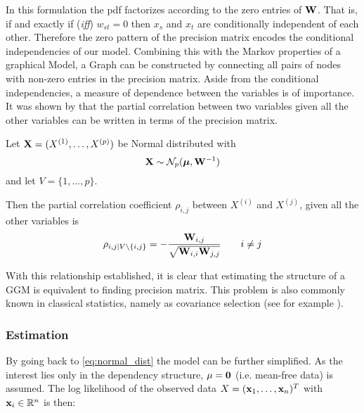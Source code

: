 In this formulation the \gls{pdf} factorizes according to the zero entries of $\mathbf{W}$.
That is, if and exactly if (\textit{iff}) $w_{st}=0$ then $x_s$ and $x_t$ are conditionally independent of each other.
Therefore the zero pattern of the precision matrix encodes the conditional independencies of our model.
Combining this with the Markov properties of a graphical Model, a Graph can be constructed by connecting all pairs of nodes with non-zero entries in the precision matrix.
Aside from the conditional independencies, a measure of dependence between the variables is of importance.
It was shown by \cite{lauritzen1996graphical} that the partial correlation between two variables given all the other variables can be written in terms of the precision matrix.
\begin{tcolorbox}[colback=yellow!5!white,colframe=yellow!75!black, title=Partial Correlation Coefficient]
	Let $\mathbf{X}=(X^{(1)},\dots, X^{(p)})$ be Normal distributed with
	$$\mathbf{X}\sim \mathcal{N}_p(\boldsymbol{\mu}, \mathbf{W}^{-1})$$
	and let $V = \{1,\dots,p\}$.
		
	Then the partial correlation coefficient $\rho_{i,j}$ between $X^{(i)}$ and $X^{(j)}$, given all the other variables is
	\begin{equation}
		\rho_{i,j|V\setminus \{i,j\}} = - \frac{\mathbf{W}_{i,j}}{\sqrt{\mathbf{W}_{i,i}\mathbf{W}_{j,j}}}
		\qquad i\neq j
	\end{equation}	
		
	\citep{lauritzen1996graphical}
\end{tcolorbox}


With this relationship established, it is clear that estimating the structure of a \gls{GGM} is equivalent to finding precision matrix.
This problem is also commonly known in classical statistics, namely as covariance selection (see for example \citet{dempster1972covariance}).

\subsubsection*{Estimation}
By going back to \autoref{eq:normal_dist} the model can be further simplified.
As the interest lies only in the dependency structure, $\mathbf{\mu} = \mathbf{0}$ (i.e. mean-free data) is assumed.
The log likelihood of the observed data $X=(\mathbf{x}_1, \dots, \mathbf{x}_n)^T$ with $\mathbf{x}_i \in\mathbb{R}^{n}$ is then:

